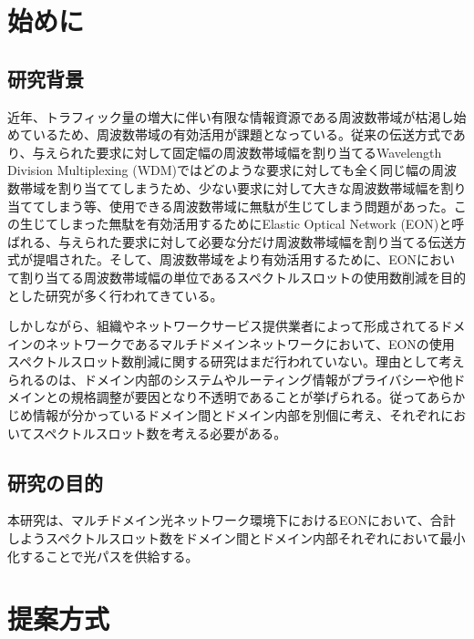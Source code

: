 \documentclass[a4j,twocolumn,fleqn]{jarticle}
\begin{document}
 
\Title
\section{始めに}
\subsection{研究背景}
近年、トラフィック量の増大に伴い有限な情報資源である周波数帯域が枯渇し始めているため、周波数帯域の有効活用が課題となっている。従来の伝送方式であり、与えられた要求に対して固定幅の周波数帯域幅を割り当てるWavelength Division Multiplexing (WDM)ではどのような要求に対しても全く同じ幅の周波数帯域を割り当ててしまうため、少ない要求に対して大きな周波数帯域幅を割り当ててしまう等、使用できる周波数帯域に無駄が生じてしまう問題があった。この生じてしまった無駄を有効活用するためにElastic Optical Network (EON)と呼ばれる、与えられた要求に対して必要な分だけ周波数帯域幅を割り当てる伝送方式が提唱された。そして、周波数帯域をより有効活用するために、EONにおいて割り当てる周波数帯域幅の単位であるスペクトルスロットの使用数削減を目的とした研究が多く行われてきている。

しかしながら、組織やネットワークサービス提供業者によって形成されてるドメインのネットワークであるマルチドメインネットワークにおいて、EONの使用スペクトルスロット数削減に関する研究はまだ行われていない。理由として考えられるのは、ドメイン内部のシステムやルーティング情報がプライバシーや他ドメインとの規格調整が要因となり不透明であることが挙げられる。従ってあらかじめ情報が分かっているドメイン間とドメイン内部を別個に考え、それぞれにおいてスペクトルスロット数を考える必要がある。
\subsection{研究の目的}
本研究は、マルチドメイン光ネットワーク環境下におけるEONにおいて、合計しようスペクトルスロット数をドメイン間とドメイン内部それぞれにおいて最小化することで光パスを供給する。
\section{提案方式}
%
\end{document}
